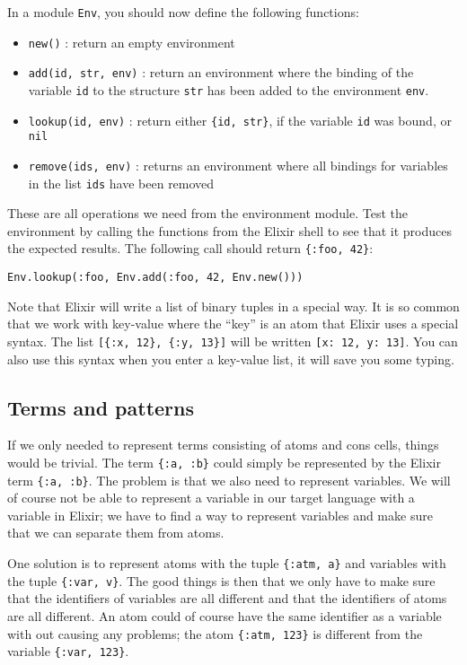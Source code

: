 \documentclass[a4paper,11pt]{article}
\begin{document}
In a module {\tt Env}, you should now define the following functions:

\begin{itemize}
\item {\tt new()} : return an empty environment

\item {\tt add(id, str, env)} : return an environment where the
  binding of the variable {\tt id} to the structure {\tt str} has been
  added to the environment {\tt env}.

\item {\tt lookup(id, env)} : return either {\tt \{id, str\}}, if the
  variable {\tt id} was bound, or {\tt nil}

\item {\tt remove(ids, env)} : returns an environment where all
  bindings for variables in the list {\tt ids} have been removed
\end{itemize}

These are all operations we need from the environment module. Test the
environment by calling the functions from the Elixir shell to see that
it produces the expected results. The following
call should return {\tt \{:foo,  42\}}:

\begin{verbatim}
Env.lookup(:foo, Env.add(:foo, 42, Env.new()))
\end{verbatim}

Note that Elixir will write a list of binary tuples in a special
way. It is so common that we work with key-value where the ``key'' is
an atom that Elixir uses a special syntax. The list {\tt [\{:x, 12\},
  \{:y, 13\}]} will be written {\tt [x: 12, y: 13]}. You can also use this
syntax when you enter a key-value list, it will save you some typing.

\subsection{Terms and patterns}

If we only needed to represent terms consisting of atoms and
cons cells, things would be trivial. The term {\tt \{:a, :b\}} could
simply be represented by the Elixir term {\tt \{:a, :b\}}. The problem
is that we also need to represent variables. We will of
course not be able to represent a variable in our target language with
a variable in Elixir; we have to find a way to represent variables and
make sure that we can separate them from atoms.

One solution is to represent atoms with the tuple {\tt \{:atm, a\}} and
variables with the tuple {\tt \{:var, v\}}. The good things is then
that we only have to make sure that the identifiers of variables are
all different and that the identifiers of atoms are all different. An
atom could of course have the same identifier as a variable with out
causing any problems; the atom {\tt \{:atm, 123\}} is different from
the variable {\tt \{:var, 123\}}.
\end{document}
